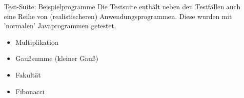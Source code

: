 \begin{frame}{Test-Suite: Beispielprogramme}
Die Testsuite enthält neben den Testfällen auch eine Reihe von (realistischeren) Anwendungsprogrammen. Diese wurden mit 'normalen' Javaprogrammen getestet.

\begin{itemize}
	\item Multiplikation
	\item Gaußsumme (kleiner Gauß)
	\item Fakultät
	\item Fibonacci
\end{itemize}	
\end{frame}


